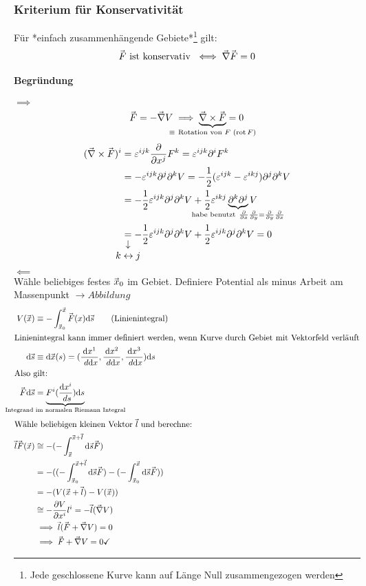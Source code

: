 \documentclass[a4paper]{scrartcl}
\DeclareMathOperator{\rot}{rot}
\renewcommand{\d}{\mathrm{d}}
\newcommand{\dd}[2]{\frac{\d #1}{\ d#2}}
\renewcommand{\v}[1]{\mathrlap{\vec{\mkern-2mu\phantom{#1}}}#1}
\theoremstyle{definition}
\theoremstyle{plain}
\theoremstyle{remark}
\theoremstyle{remark}
\begin{document}
\subsubsection{Kriterium für Konservativität}
\label{sec-4-3-2}
Für *einfach zusammenhängende Gebiete*\footnote{Jede geschlossene Kurve kann auf Länge Null zusammengezogen werden} gilt:
\[\v F ~\text{ist konservativ}~ \iff \v\nabla\v F = 0\]
\paragraph{Begründung}
\label{sec-4-3-2-1}
$\implies$ \\ \[\v F = -\v\nabla V \implies \underbrace{\v\nabla\times\v F}_{\mathclap{\equiv~\text{Rotation von $F$ ($\rot{F}$)}}} = 0\]
\begin{align*}
(\v\nabla\times\v F)^i &= \varepsilon^{ijk} \frac{\partial}{\partial x^j} F^k = \varepsilon^{ijk}\partial^i F^k \\
&= -\varepsilon^{ijk}\partial^j\partial^k V = -\frac{1}{2}(\varepsilon^{ijk} -\varepsilon^{ikj})\partial^j\partial^k V \\
&= - \frac{1}{2}\varepsilon^{ijk}\partial^j \partial^k V + \frac{1}{2}\varepsilon^{ikj}\underbrace{\partial^k\partial^j}_{\mathclap{\text{habe benutzt}~\frac{\partial}{\partial x}\frac{\partial}{\partial y} = \frac{\partial}{\partial y}\frac{\partial}{\partial x}}} V \\
&\underarrow[=]{$k \leftrightarrow j$} -\frac{1}{2}\varepsilon^{ijk}\partial^j\partial^k V + \frac{1}{2}\varepsilon^{ijk}\partial^j\partial^k V = 0
\end{align*}
$\impliedby$ \\
     Wähle beliebiges festes $\v x_0$ im Gebiet. Definiere Potential als minus Arbeit am Massenpunkt $\rightarrow Abbildung$
\begin{align*}
V(\v x) &\equiv -\int_{\v x_0}^{\v x} \v F(x)\d\v s \tag{Linienintegral} \\
\intertext{Linienintegral kann immer definiert werden, wenn Kurve durch Gebiet mit Vektorfeld verläuft}
\d\v s &\equiv \d\v x(s) =(\dd{x^1}{\d x}, \dd{x^2}{\d x}, \dd{x^3}{\d x}) \d s \\
\intertext{Also gilt:}
\v F\d\v s &= \underbrace{F^i (\dd{x^i}{s})\d s}_{\mathclap{\text{Integrand im normalen Riemann Integral}}} \\
\intertext{Wähle beliebigen kleinen Vektor $\v l$ und berechne:}
\v l \v F(\v x) &\cong -(-\int_{\v x}^{\v x + \v l} \d\v s \v F) \\
&= -((-\int_{\v x_0}^{\v x + \v l} \d \v s \v F) - ( -\int_{\v x_0}^{\v x} \d\v s \v F)) \\
&= -(V(\v x + \v l) -V(\v x)) \\
&\cong - \frac{\partial V}{\partial x^i}l^i = -\v l(\v\nabla V) \\
&\implies \v l(\v F + \v\nabla V) = 0 \\
&\implies \v F + \v\nabla V = 0 \checkmark
\end{align*}
\end{document}
